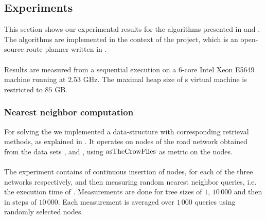 \subsection{Experiments}
	This section shows our experimental results for the algorithms presented in 
	and . The algorithms are implemented in the context of the \cobweb {} project,
	which is an open-source \multiModal route planner written in \java.\\\\
	Results are measured from a sequential execution on a $6$-core Intel Xeon E5649 machine running at $2.53$ GHz.
	The maximal heap size of {\java}s virtual machine is restricted to $85$ GB.

\subsubsection{Nearest neighbor computation}
	For solving the \nearestNeighborProblem we implemented a \coverTree data-structure with corresponding retrieval methods,
	as explained in . It operates on nodes of the road network obtained from the data sets
	\freiburgR, \stuttgartR and \switzerlandR, using $\operatorname{asTheCrowFlies}$ as metric on the nodes.\\\\
	The experiment contains of continuous insertion of nodes, for each of the three networks respectively, and then measuring
	random nearest neighbor queries, i.e. the execution time of . Measurements are done for tree sizes
	of $1$, $10\,000$ and then in steps of $10\,000$. Each measurement is averaged over $1\,000$ queries using randomly selected nodes.\\
